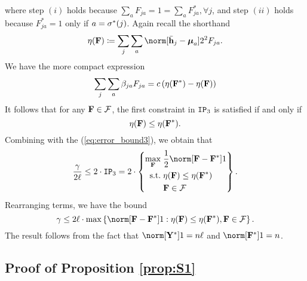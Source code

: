 where step $(i)$ holds because $\sum_{a}F_{ja}=1=\sum_{a}F_{ja}^{*},\forall j$,
and step $(ii)$ holds because $F_{ja}^{*}=1$ only if $a=\sigma^{*}(j)$.
Again recall the shorthand
\[
\eta(\F)\coloneqq\sum_{j}\sum_{a}\norm[\bar{\h}_{j}-\Mean_{a}]2^{2}F_{ja}.
\]
We have the more compact expression
\begin{equation}
\sum_{j}\sum_{a}\beta_{ja}F_{ja}=c\left(\eta(\mathbf{F}^{*})-\eta(\mathbf{F})\right)\label{eq:eta_func_equivalence}
\end{equation}
It follows that for any $\mathbf{F}\in\mathcal{F}$, the first constraint
in $\textup{\texttt{IP}}_{3}$ is satisfied if and only if 
\[
\eta(\mathbf{F})\le\eta(\mathbf{F}^{*}).
\]
Combining with the (\ref{eq:error_bound3}), we obtain that
\[
\frac{\error}{2\size}\le2\cdot\IP_{3}=2\cdot\left\{ \begin{aligned}\max_{\F}\; & \frac{1}{2}\norm[\F-\F^{*}]1\\
\text{s.t.}\; & \eta(\F)\le\eta(\F^{*})\\
 & \F\in\mathcal{F}
\end{aligned}
\right\} .
\]
Rearranging terms, we have the bound
\begin{equation}
\error\le2\size\cdot\max\left\{ \norm[\F-\F^{*}]1:\eta(\F)\le\eta(\F^{*}),\F\in\mathcal{F}\right\} .\label{eq:error_bound3a}
\end{equation}
The result follows from the fact that $\norm[\Ystar]1=\num\size$
and $\norm[\F^{*}]1=\num$. 

\subsection{Proof of Proposition \ref{prop:S1} \label{sec:proof_S1}}

